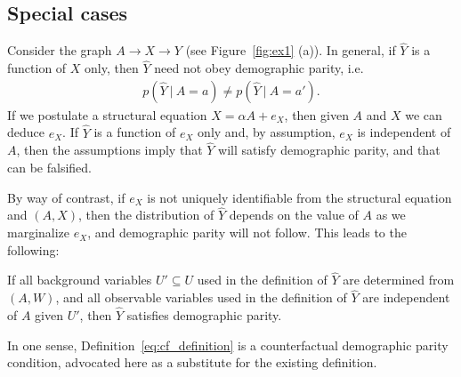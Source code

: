 \subsection{Special cases}
%
Consider the graph $A \rightarrow X \rightarrow Y$ (see
Figure~\ref{fig:ex1} (a)). In general, if $\hat Y$ is a function of
$X$ only, then $\hat Y$ need not obey demographic parity, i.e.
\begin{align}
  p(\hat Y\ |\ A = a) \neq p(\hat Y\ |\ A = a').\nonumber
\end{align}
If we postulate a
structural equation $X = \alpha A + e_X$, then given $A$ and $X$ we
can deduce $e_X$. If $\hat Y$ is a function of $e_X$ only and, by
assumption, $e_X$ is independent of $A$, then the assumptions imply
that $\hat Y$ will satisfy demographic parity, and that can be
falsified.

By way of contrast, if $e_X$ is not uniquely identifiable from the structural equation and $(A, X)$, then the distribution of $\hat Y$ depends on the value of $A$ as we marginalize $e_X$, and demographic parity will not follow. This leads to the following:

\begin{lem}
If all background variables $U' \subseteq U$ used in the definition of $\hat Y$ are determined from $(A, W)$, and all observable variables used in the definition of $\hat Y$ are independent of $A$ given $U'$, then $\hat Y$ satisfies demographic parity. %
\end{lem}
  
In one sense, Definition~\ref{eq:cf_definition} is a counterfactual demographic parity condition, advocated here as a substitute for the existing definition.

